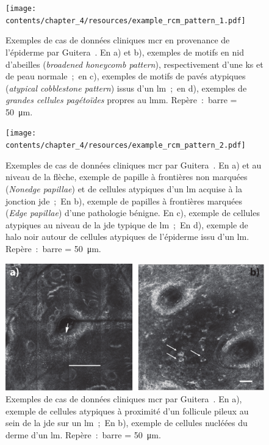 \begin{figure}[p]
    \begin{center}
        \texttt{[image: contents/chapter\_4/resources/example\_rcm\_pattern\_1.pdf]}
        \caption{Exemples de cas de données cliniques \gls{mcr} en provenance de l'épiderme par Guitera~. En a) et b), exemples de motifs en nid d'abeilles (\textit{broadened honeycomb pattern}), respectivement d'une \gls{ks} et de peau normale~;~en c), exemples de motifs de pavés atypiques (\textit{atypical cobblestone pattern}) issus d'un \gls{lm}~;~en d), exemples de \textit{grandes cellules pagétoïdes} propres au \gls{lmm}. Repère~:~barre = \SI{50}{\micro\metre}.}
        \label{fig:example_rcm_pattern_1}
    \end{center} 
\end{figure}\par

\begin{figure}[p]
    \begin{center}
        \texttt{[image: contents/chapter\_4/resources/example\_rcm\_pattern\_2.pdf]}
        \caption{Exemples de cas de données cliniques \gls{mcr} par Guitera~. En a) et au niveau de la flèche, exemple de papille à frontières non marquées (\textit{Nonedge papillae}) et de cellules atypiques d'un \gls{lm} acquise à la jonction \gls{jde}~;~En b), exemple de papilles à frontières marquées (\textit{Edge papillae}) d'une pathologie bénigne. En c), exemple de cellules atypiques au niveau de la \gls{jde} typique de \gls{lm}~;~En d), exemple de halo noir autour de cellules atypiques de l'épiderme issu d'un \gls{lm}. Repère~:~barre = \SI{50}{\micro\metre}.}
        \label{fig:example_rcm_pattern_2}
    \end{center} 
\end{figure}\par

\begin{figure}[H]
    \begin{center}
        \includegraphics[width=\linewidth]{contents/chapter_4/resources/example_rcm_pattern_3.pdf}
        \caption{Exemples de cas de données cliniques \gls{mcr} par Guitera~. En a), exemple de cellules atypiques à proximité d'un follicule pileux au sein de la \gls{jde} sur un \gls{lm}~;~En b), exemple de cellules nucléées du derme d'un \gls{lm}. Repère~:~barre = \SI{50}{\micro\metre}.}
        \label{fig:example_rcm_pattern_3}
    \end{center} 
\end{figure}\par

